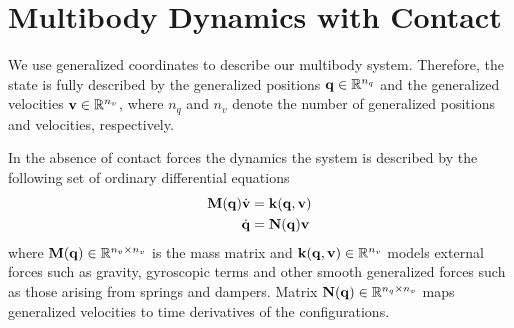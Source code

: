 \section{Multibody Dynamics with Contact}
\label{sec:multibody_dynamics_with_contact}

We use generalized coordinates to describe our multibody system. Therefore, the
state is fully described by the generalized positions
${\mathbf{q}}\in\mathbb{R}^{n_q}$ and the generalized velocities
${\mathbf{v}}\in\mathbb{R}^{n_v}$, where $n_q$ and $n_v$ denote the number of
generalized positions and velocities, respectively.

In the absence of contact forces the dynamics the system is described
by the following set of ordinary differential equations
\begin{align}
    \mf{M}(\mf{q})\dot{\mf{v}}&=\mf{k}(\mf{q},\mf{v})
    \label{eq:momentum_continuous}\\
    \dot{\mf{q}}&=\mf{N}(\mf{q})\mf{v}
    \label{eq:v_to_qdot}
\end{align}
where ${\mathbf{M}}({\mathbf{q}})\in\mathbb{R}^{n_v\times n_v}$ is the mass matrix and
${\mathbf{k}}({\mathbf{q}},{\mathbf{v}})\in\mathbb{R}^{n_v}$ models external forces such as
gravity, gyroscopic terms and other smooth generalized forces such as those
arising from springs and dampers. Matrix ${\mathbf{N}}({\mathbf{q}})\in\mathbb{R}^{n_q\times
n_v}$ maps generalized velocities to time derivatives of the configurations.

